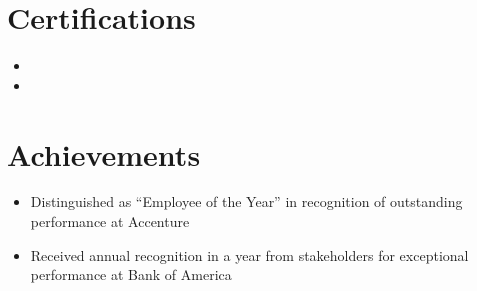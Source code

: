 \documentclass[11pt,a4paper]{article}
\begin{document}
\section{Certifications}
\normalsize
\begin{itemize}[itemsep=1pt]
  \item {}
  \item {}
\end{itemize}

\section{Achievements}
\normalsize
\begin{itemize}
  \item Distinguished as ``Employee of the Year'' in recognition of outstanding performance at Accenture
  \item Received annual recognition in a year from stakeholders for exceptional performance at Bank of America
\end{itemize}
\end{document}
